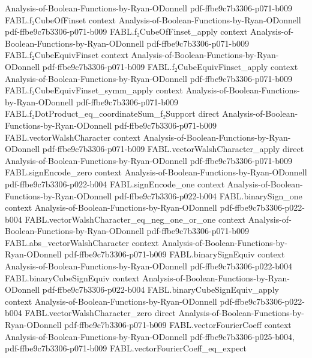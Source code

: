 \begin{theorem}
  {Analysis-of-Boolean-Functions-by-Ryan-ODonnell}
  {pdf-ffbe9c7b3306-p071-b009}
\proofstep
  {FABL.f₂CubeOfFinset}
  {context}
  {Analysis-of-Boolean-Functions-by-Ryan-ODonnell}
  {pdf-ffbe9c7b3306-p071-b009}
\proofstep
  {FABL.f₂CubeOfFinset_apply}
  {context}
  {Analysis-of-Boolean-Functions-by-Ryan-ODonnell}
  {pdf-ffbe9c7b3306-p071-b009}
\proofstep
  {FABL.f₂CubeEquivFinset}
  {context}
  {Analysis-of-Boolean-Functions-by-Ryan-ODonnell}
  {pdf-ffbe9c7b3306-p071-b009}
\proofstep
  {FABL.f₂CubeEquivFinset_apply}
  {context}
  {Analysis-of-Boolean-Functions-by-Ryan-ODonnell}
  {pdf-ffbe9c7b3306-p071-b009}
\proofstep
  {FABL.f₂CubeEquivFinset_symm_apply}
  {context}
  {Analysis-of-Boolean-Functions-by-Ryan-ODonnell}
  {pdf-ffbe9c7b3306-p071-b009}
\proofstep
  {FABL.f₂DotProduct_eq_coordinateSum_f₂Support}
  {direct}
  {Analysis-of-Boolean-Functions-by-Ryan-ODonnell}
  {pdf-ffbe9c7b3306-p071-b009}
\proofstep
  {FABL.vectorWalshCharacter}
  {context}
  {Analysis-of-Boolean-Functions-by-Ryan-ODonnell}
  {pdf-ffbe9c7b3306-p071-b009}
\proofstep
  {FABL.vectorWalshCharacter_apply}
  {direct}
  {Analysis-of-Boolean-Functions-by-Ryan-ODonnell}
  {pdf-ffbe9c7b3306-p071-b009}
\proofstep
  {FABL.signEncode_zero}
  {context}
  {Analysis-of-Boolean-Functions-by-Ryan-ODonnell}
  {pdf-ffbe9c7b3306-p022-b004}
\proofstep
  {FABL.signEncode_one}
  {context}
  {Analysis-of-Boolean-Functions-by-Ryan-ODonnell}
  {pdf-ffbe9c7b3306-p022-b004}
\proofstep
  {FABL.binarySign_one}
  {context}
  {Analysis-of-Boolean-Functions-by-Ryan-ODonnell}
  {pdf-ffbe9c7b3306-p022-b004}
\proofstep
  {FABL.vectorWalshCharacter_eq_neg_one_or_one}
  {context}
  {Analysis-of-Boolean-Functions-by-Ryan-ODonnell}
  {pdf-ffbe9c7b3306-p071-b009}
\proofstep
  {FABL.abs_vectorWalshCharacter}
  {context}
  {Analysis-of-Boolean-Functions-by-Ryan-ODonnell}
  {pdf-ffbe9c7b3306-p071-b009}
\proofstep
  {FABL.binarySignEquiv}
  {context}
  {Analysis-of-Boolean-Functions-by-Ryan-ODonnell}
  {pdf-ffbe9c7b3306-p022-b004}
\proofstep
  {FABL.binaryCubeSignEquiv}
  {context}
  {Analysis-of-Boolean-Functions-by-Ryan-ODonnell}
  {pdf-ffbe9c7b3306-p022-b004}
\proofstep
  {FABL.binaryCubeSignEquiv_apply}
  {context}
  {Analysis-of-Boolean-Functions-by-Ryan-ODonnell}
  {pdf-ffbe9c7b3306-p022-b004}
\proofstep
  {FABL.vectorWalshCharacter_zero}
  {direct}
  {Analysis-of-Boolean-Functions-by-Ryan-ODonnell}
  {pdf-ffbe9c7b3306-p071-b009}
\proofstep
  {FABL.vectorFourierCoeff}
  {context}
  {Analysis-of-Boolean-Functions-by-Ryan-ODonnell}
  {pdf-ffbe9c7b3306-p025-b004,
    pdf-ffbe9c7b3306-p071-b009}
\proofstep
  {FABL.vectorFourierCoeff_eq_expect}

\end{theorem}
